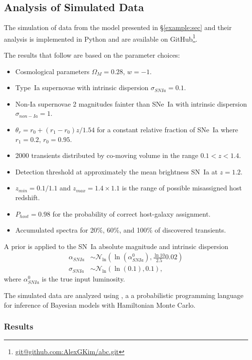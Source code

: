 \documentclass[preprint]{aastex}
\begin{document}
\subsection{Analysis of Simulated Data}
The simulation of data from the model presented in \S\ref{example:sec}
and their analysis is implemented in Python and are available
on GitHub\footnote{\url{git@github.com:AlexGKim/abc.git}}.

The results that follow are based on the parameter
choices:
\begin{itemize}
\item Cosmological parameters $\Omega_M=0.28$, $w=-1$.
\item Type~Ia supernovae with intrinsic dispersion $\sigma_{SNIa}=0.1$.
\item Non-Ia supernovae 2 magnitudes fainter than SNe~Ia with intrinsic
dispersion $\sigma_{non-Ia}=1$.
\item $\theta_r=r_0 + (r_1-r_0)z/1.54$ for a constant relative fraction of SNe~Ia where $r_1=0.2$,
$r_0=0.95$.
\item 2000 transients distributed by co-moving volume in the range $0.1<z<1.4$.
\item Detection threshold at approximately the mean brightness SN~Ia at $z=1.2$.
\item $z_{min}=0.1/1.1$ and $z_{max}=1.4\times 1.1$ is the range of possible misassigned
host redshift.
\item $P_{host}=0.98$ for the probability of correct host-galaxy assignment.
\item Accumulated spectra for 20\%, 60\%, and 100\% of discovered transients.
\end{itemize}

A prior is applied to the SN~Ia absolute magnitude and intrinsic dispersion
\begin{align}
\alpha_{SNIa} & \sim \mathcal{N}_{\ln}\left(\ln\left(\alpha^0_{SNIa}\right),\frac{\ln{10}}{2.5}0.02\right)\\
\sigma_{SNIa} & \sim \mathcal{N}_{\ln}\left(\ln\left(0.1\right),0.1\right),
\end{align}
where $\alpha^0_{SNIa}$ is the true input luminosity.

The simulated data are analyzed using 
\citet{stan-software:2015}, a
a probabilistic programming language for
inference of Bayesian models with Hamiltonian Monte Carlo.

\subsubsection{Results}
\end{document}
